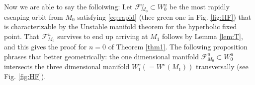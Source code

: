\documentclass[a4paper,11pt]{article}
\theoremstyle{remark}
\begin{document}
% 

Now we are able to say the folloiwing: Let $\mathcal{F}^u_{M_0}\subset W^u_0$ be the most rapidly escaping orbit from $M_0$ satisfying \eqref{eq:rapid} (thee green one in Fig. \ref{fig:HF}) that is characterizable by the Unstable manifold theorem for the hyperbolic fixed point. That $\mathcal{F}^u_{M_0}$ survives to end up arriving at $M_1$ follows by Lemma \ref{lem:T}, and this gives the proof for $n=0$ of Theorem \ref{thm1}. The following proposition phrases that better geometrically: the one dimensional manifold $\mathcal{F}^u_{M_0}\subset W^u_0$ intersects the three dimensional manifold $W_1^s(=W^s(M_1))$ transversally (see Fig. \ref{fig:HF}).
\end{document}
